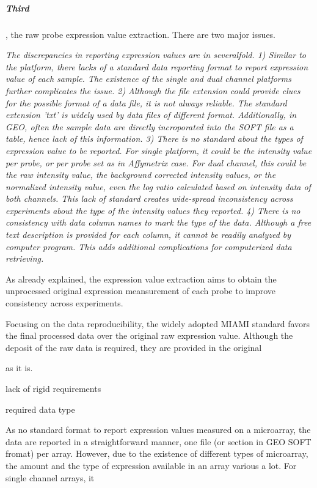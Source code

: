 \subparagraph{Third}, the raw probe expression value extraction. There are two major issues.


\textit{The discrepancies in reporting expression values are in
  severalfold.
%
1) Similar to the platform, there lacks of a standard data reporting format to
report expression value of each sample.  The existence of the single and dual
channel platforms further complicates the issue.  
%
2) Although the file extension could provide clues for the possible format of a
data file, it is not always reliable.  The standard extension 'txt' is widely
used by data files of different format.  Additionally, in GEO, often the sample
data are directly incroporated into the SOFT file as a table, hence lack of
this information.
%
3) There is no standard about the types of expression value to be reported.
For single platform, it could be the intensity value per probe, or per probe
set as in Affymetrix case.  For dual channel, this could be the raw intensity
value, the background corrected intensity values, or the normalized intensity
value, even the log ratio calculated based on intensity data of both channels.
%
This lack of standard creates wide-spread inconsistency across experiments
about the type of the intensity values they reported. 
%
4) There is no consistency with data column names to mark the type of the
data.  Although a free text description is provided for each column, it
cannot be readily analyzed by computer program.  This adds additional
complications for computerized data retrieving.  }



As already explained, the expression value extraction aims to obtain the
unprocessed original expression meansurement of each probe to improve
consistency across experiments.



Focusing on the data reproducibility, the widely adopted MIAMI
\cite{MIAMI} standard favors the final processed data over the original
raw expression value.
%
Although the deposit of the raw data is required, they are provided in
the original 

as it
is.
%


 lack of rigid
requirements 

 required data type



As no standard format to report expression values measured on a
microarray, the data are reported in a straightforward manner, one file
(or section in GEO SOFT fromat) per array.
%
However, due to the existence of different types of microarray, the amount
and the type of expression available in an array various a lot.
%
For single channel arrays, it 


